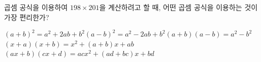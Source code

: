 곱셈 공식을 이용하여 $198\times201$을 계산하려고 할 때, 어떤 곱셈 공식을 이용하는 것이 가장 편리한가?
\begin{choicesv}{$(a+b)^2=a^2+2ab+b^2$}{$(a-b)^2=a^2-2ab+b^2$}{$(a+b)(a-b)=a^2-b^2$}{$(x+a)(x+b)=x^2+(a+b)x+ab$}{$(ax+b)(cx+d)=acx^2+(ad+bc)x+bd$}\end{choicesv}
